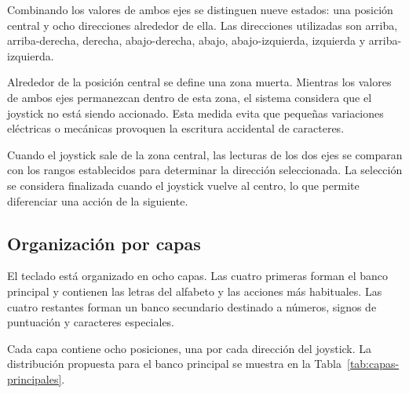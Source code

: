 Combinando los valores de ambos ejes se distinguen nueve estados: una posición central y ocho direcciones alrededor de ella. Las direcciones utilizadas son arriba, arriba-derecha, derecha, abajo-derecha, abajo, abajo-izquierda, izquierda y arriba-izquierda.

Alrededor de la posición central se define una zona muerta. Mientras los valores de ambos ejes permanezcan dentro de esta zona, el sistema considera que el joystick no está siendo accionado. Esta medida evita que pequeñas variaciones eléctricas o mecánicas provoquen la escritura accidental de caracteres.

Cuando el joystick sale de la zona central, las lecturas de los dos ejes se comparan con los rangos establecidos para determinar la dirección seleccionada. La selección se considera finalizada cuando el joystick vuelve al centro, lo que permite diferenciar una acción de la siguiente.

\subsection{Organización por capas}
\label{subsec:organizacion-capas}

El teclado está organizado en ocho capas. Las cuatro primeras forman el banco principal y contienen las letras del alfabeto y las acciones más habituales. Las cuatro restantes forman un banco secundario destinado a números, signos de puntuación y caracteres especiales.

Cada capa contiene ocho posiciones, una por cada dirección del joystick. La distribución propuesta para el banco principal se muestra en la Tabla~\ref{tab:capas-principales}.

\begin{table}[ht]
    \centering
    \caption{Distribución de las capas principales}
    \label{tab:capas-principales}
\end{table}

